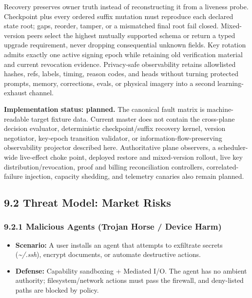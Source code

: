 \documentclass[
  11pt,
]{article}
\providecommand{\tightlist}{%
  \setlength{\itemsep}{0pt}\setlength{\parskip}{0pt}}
\begin{document}
Recovery preserves owner truth instead of reconstructing it from a liveness
probe. Checkpoint plus every ordered suffix mutation must reproduce each
declared state root; gaps, reorder, tamper, or a mismatched final root fail
closed. Mixed-version peers select the highest mutually supported schema or
return a typed upgrade requirement, never dropping consequential unknown
fields. Key rotation admits exactly one active signing epoch while retaining
old verification material and current revocation evidence. Privacy-safe
observability retains allowlisted hashes, refs, labels, timing, reason codes,
and heads without turning protected prompts, memory, corrections, evals, or
physical imagery into a second learning-exhaust channel.

\textbf{Implementation status: planned.} The canonical fault matrix is
machine-readable target fixture data. Current master does not contain the
cross-plane decision evaluator, deterministic checkpoint/suffix recovery
kernel, version negotiator, key-epoch transition validator, or
information-flow-preserving observability projector described here.
Authoritative plane observers, a scheduler-wide live-effect choke point,
deployed restore and mixed-version rollout, live key
distribution/revocation, proof and billing reconciliation controllers,
correlated-failure injection, capacity shedding, and telemetry canaries also
remain planned.

\hypertarget{threat-model-market-risks}{%
\subsection{9.2 Threat Model: Market
Risks}\label{threat-model-market-risks}}

\hypertarget{malicious-agents-trojan-horse-device-harm}{%
\subsubsection{9.2.1 Malicious Agents (Trojan Horse / Device
Harm)}\label{malicious-agents-trojan-horse-device-harm}}

\begin{itemize}
\tightlist
\item
  \textbf{Scenario:} A user installs an agent that attempts to
  exfiltrate secrets (\emph{\textasciitilde/.ssh}), encrypt documents,
  or automate destructive actions.
\item
  \textbf{Defense:} Capability sandboxing + Mediated I/O. The agent has
  no ambient authority; filesystem/network actions must pass the
  firewall, and deny-listed paths are blocked by policy.
\end{itemize}
\end{document}
